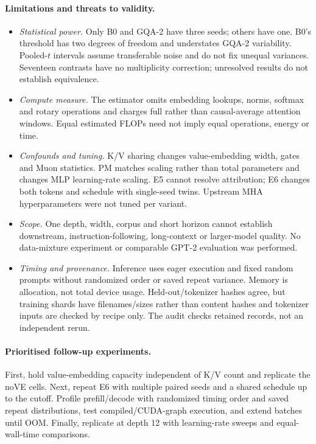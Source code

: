 \documentclass[10pt,twocolumn]{article}
\begin{document}
\paragraph{Limitations and threats to validity.}\label{sec:limits}
\begin{itemize}
\item \emph{Statistical power.} Only B0 and GQA-2 have three seeds; others have one. B0's threshold has two degrees of
freedom and understates GQA-2 variability. Pooled-$t$ intervals assume transferable noise and do not fix unequal
variances. Seventeen contrasts have no multiplicity correction; unresolved results do not establish equivalence.
\item \emph{Compute measure.} The estimator omits embedding lookups, norms, softmax and rotary operations and charges
full rather than causal-average attention windows. Equal estimated FLOPs need not imply equal operations, energy or time.
\item \emph{Confounds and tuning.} K/V sharing changes value-embedding width, gates and Muon statistics. PM matches
scaling rather than total parameters and changes MLP learning-rate scaling. E5 cannot resolve attribution; E6 changes
both tokens and schedule with single-seed twins. Upstream MHA hyperparameters were not tuned per variant.
\item \emph{Scope.} One depth, width, corpus and short horizon cannot establish downstream, instruction-following,
long-context or larger-model quality. No data-mixture experiment or comparable GPT-2 evaluation was performed.
\item \emph{Timing and provenance.} Inference uses eager execution and fixed random prompts without randomized order
or saved repeat variance. Memory is allocation, not total device usage. Held-out/tokenizer hashes agree, but training
shards have filenames/sizes rather than content hashes and tokenizer inputs are checked by recipe only.
The audit checks retained records, not an independent rerun.
\end{itemize}

\paragraph{Prioritised follow-up experiments.}
First, hold value-embedding capacity independent of K/V count and replicate the noVE cells. Next, repeat E6 with
multiple paired seeds and a shared schedule up to the cutoff. Profile prefill/decode with randomized timing order
and saved repeat distributions, test compiled/CUDA-graph execution, and extend batches until OOM. Finally, replicate
at depth 12 with learning-rate sweeps and equal-wall-time comparisons.
\end{document}
